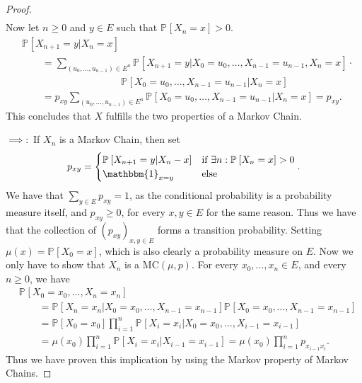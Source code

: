 \begin{proof}
\begin{align}
\end{align}
Now let $n\geq 0$ and $y \in E$ such that $\mathbb{P}_{} \left[ X_n = x \right] > 0$.
\begin{align}
&	\mathbb{P}_{} \left[ X_{n+1} = y | X_n =x \right] \\
&\qquad = \sum_{(u_0, \ldots ,u_{n-1}) \in E^n}^{} \mathbb{P}_{} \left[ X_{n+1}=y | X_0=u_0, \ldots ,X_{n-1}=u_{n-1}, X_n =x \right] \cdot \\
& \qquad \qquad \qquad \qquad \qquad  \mathbb{P}_{} \left[ X_0=u_0, \ldots , X_{n-1}=u_{n-1} | X_n = x \right] \\
&\qquad = p_{xy} \sum_{(u_0, \ldots ,u_{n-1})\in E^n}^{} \mathbb{P}_{} \left[ X_0=u_0, \ldots ,X_{n-1}=u_{n-1} | X_n = x \right] = p_{xy}
.\end{align}
This concludes that $X$ fulfills the two properties of a Markov Chain.

{\color{blue}
	$\implies:$ If $X_n$ is a Markov Chain, then set
	\begin{align}
		p_{xy} = 
	\begin{cases}
		\mathbb{P}_{} \left[ X_{n+1}=y | X_n -x \right] & \textrm{if } \exists n: \mathbb{P}_{} \left[ X_n = x \right] >0 \\
		\mathbbm{1}_{x=y} & \textrm{else}
	\end{cases}.
	\end{align}
	We have that $\sum_{y \in E}^{} p_{xy}=1$, as the conditional probability is a probability measure itself, and $p_{xy}\geq 0$, for every $x, y \in E$ for the same reason. Thus we have that the collection of $(p_{xy})_{x,y \in E}$ forms a transition probability. Setting $\mu(x) = \mathbb{P}_{} \left[ X_0 =x \right] $, which is also clearly a probability measure on $E$. Now we only have to show that $X_{n} $ is a $ \textrm{MC}(\mu, p)$. For every $x_0,\ldots , x_n \in E$, and every $n\geq 0$, we have
\begin{align}
& \mathbb{P}_{} \left[ X_0=x_0, \ldots ,X_n=x_n \right] \\ 
	& \qquad = \mathbb{P}_{} \left[ X_n = x_n | X_0=x_0 , \ldots , X_{n-1}=x_{n-1} \right] \mathbb{P}_{} \left[ X_0=x_0 , \ldots , X_{n-1}=x_{n-1} \right] \\
	& \qquad = \mathbb{P}_{} \left[ X_0 = x_0 \right] \prod_{i=1}^{n} \mathbb{P}_{} \left[ X_i = x_i | X_0=x_0, \ldots , X_{i-1}=x_{i-1} \right] \\
	& \qquad = \mu(x_0) \prod_{i=1}^n \mathbb{P}_{} \left[ X_i = x_i | X_{i-1} = x_{i-1}  \right] = \mu(x_0) \prod_{i=1}^n p_{x_{i-1}x_{i}} 
.\end{align}
Thus we have proven this implication by using the Markov property of Markov Chains.

}
\end{proof}
